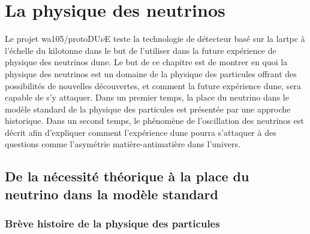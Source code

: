 


\chapter{La physique des neutrinos}\label{chap::1}

  Le projet \gls{wa105}/protoDU$\nu$E teste la technologie de détecteur basé sur la \gls{lartpc} à l'échelle du kilotonne dans le but de l'utiliser dans la future expérience de physique des neutrinos \gls{dune}. Le but de ce chapitre est de montrer en quoi la physique des neutrinos est un domaine de la physique des particules offrant des possibilités de nouvelles découvertes, et comment la future expérience \gls{dune}, sera capable de s'y attaquer. Dans un premier temps, la place du neutrino dans le modèle standard de la physique des particules est présentée par une approche historique. Dans un second temps, le phénomène de l'oscillation des neutrinos est décrit afin d'expliquer comment l'expérience \gls{dune} pourra s'attaquer à des questions comme l'asymétrie matière-antimatière dans l'univers.
    
  \section{De la nécessité théorique à la place du neutrino dans la modèle standard}
    
	\subsection{Brève histoire de la physique des particules}
	    
